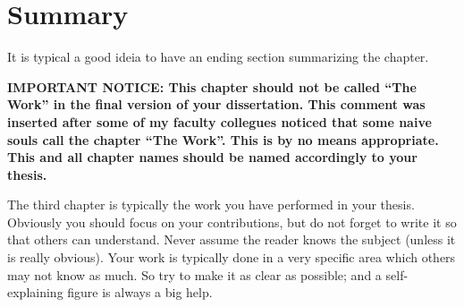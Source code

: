 \documentclass[defaultstyle,10pt,master,Helvetica]{thesis}
\begin{document}
\section{Summary}

It is typical a good ideia to have an ending section summarizing the chapter.

\cleardoublepage


{\color{red}\bfseries IMPORTANT NOTICE: This chapter should not be called ``The Work'' in the final version of your dissertation. This comment was inserted after some of my faculty collegues noticed that some naive souls call the chapter ``The Work''. This is by no means appropriate. This and all chapter names should be named accordingly to your thesis.}

The third chapter is typically the work you have performed in your thesis. Obviously you should focus on your contributions, but do not forget to write it so that others can understand. Never assume the reader knows the subject (unless it is really obvious). Your work is typically done in a very specific area which others may not know as much. So try to make it as clear as possible; and a self-explaining figure is always a big help.
\end{document}
